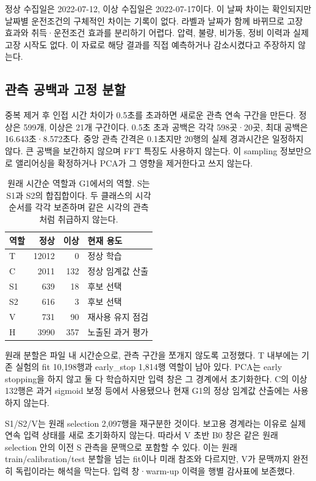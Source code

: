 \documentclass{article}
\begin{document}
정상 수집일은 2022-07-12, 이상 수집일은 2022-07-17이다. 이 날짜 차이는 확인되지만 날짜별 운전조건의 구체적인 차이는 기록이 없다. 라벨과 날짜가 함께 바뀌므로 고장 효과와 취득·운전조건 효과를 분리하기 어렵다. 압력, 불량, 비가동, 정비 이력과 실제 고장 시작도 없다. 이 자료로 해당 결과를 직접 예측하거나 감소시켰다고 주장하지 않는다.

\subsection{관측 공백과 고정 분할}
중복 제거 후 인접 시간 차이가 0.5초를 초과하면 새로운 관측 연속 구간을 만든다. 정상은 599개, 이상은 21개 구간이다. 0.5초 초과 공백은 각각 598곳·20곳, 최대 공백은 16.643초·8.572초다. 중앙 관측 간격은 0.1초지만 20행의 실제 경과시간은 일정하지 않다. 큰 공백을 보간하지 않으며 FFT 특징도 사용하지 않는다. 이 sampling 정보만으로 앨리어싱을 확정하거나 PCA가 그 영향을 제거한다고 쓰지 않는다.

\begin{table}[t]\centering\small
\caption{원래 시간순 역할과 G1에서의 역할. S는 S1과 S2의 합집합이다. 두 클래스의 시각 순서를 각각 보존하며 같은 시각의 관측처럼 취급하지 않는다.}\label{tab:data}
\begin{tabular}{lrrl}\toprule
역할 & 정상 & 이상 & 현재 용도\\\midrule
T &12012&0&정상 학습\\
C &2011&132&정상 임계값 산출\\
S1 &639&18&후보 선택\\
S2 &616&3&후보 선택\\
V &731&90&재사용 유지 점검\\
H &3990&357&노출된 과거 평가\\\bottomrule
\end{tabular}
\end{table}

원래 분할은 파일 내 시간순으로, 관측 구간을 쪼개지 않도록 고정했다. T 내부에는 기존 실험의 fit 10,198행과 early\_stop 1,814행 역할이 남아 있다. PCA는 early stopping을 하지 않고 둘 다 학습하지만 입력 창은 그 경계에서 초기화한다. C의 이상 132행은 과거 sigmoid 보정 등에서 사용됐으나 현재 G1의 정상 임계값 산출에는 사용하지 않는다.

S1/S2/V는 원래 selection 2,097행을 재구분한 것이다. 보고용 경계라는 이유로 실제 연속 입력 상태를 새로 초기화하지 않는다. 따라서 V 초반 B0 창은 같은 원래 selection 안의 이전 S 관측을 문맥으로 포함할 수 있다. 이는 원래 train/calibration/test 분할을 넘는 fit이나 미래 참조와 다르지만, V가 문맥까지 완전히 독립이라는 해석을 막는다. 입력 창·warm-up 이력을 행별 감사표에 보존했다.
\end{document}
